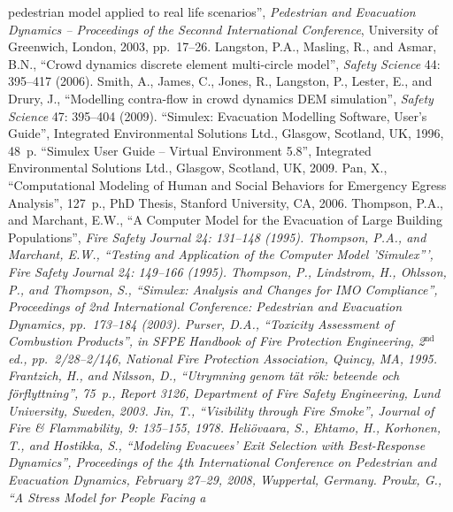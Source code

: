 \documentclass[12pt,a4paper,final,twoside]{stylevk}
\begin{document}
\begin{thebibliography}{99}
  pedestrian model applied to real life scenarios'', \emph{Pedestrian
    and Evacuation Dynamics -- Proceedings of the Seconnd International
    Conference}, University of Greenwich, London, 2003, pp.~17--26.
%
 Langston, P.A., Masling, R., and Asmar, B.N.,
  ``Crowd dynamics discrete element multi-circle model'', \emph{Safety
    Science} 44: 395--417 (2006).
%
 Smith, A., James, C., Jones, R., Langston, P.,
  Lester, E., and Drury, J., ``Modelling contra-flow in crowd dynamics
  DEM simulation'', \emph{Safety Science} 47: 395--404 (2009).
%
 ``Simulex: Evacuation Modelling Software, User's
  Guide'', Integrated Environmental Solutions Ltd., Glasgow, Scotland,
  UK, 1996, 48~p.
%
 ``Simulex User Guide -- Virtual Environment 5.8'',
  Integrated Environmental Solutions Ltd., Glasgow, Scotland, UK,
  2009.
%
 Pan, X., ``Computational Modeling of Human and Social
  Behaviors for Emergency Egress Analysis'', 127~p., PhD Thesis,
  Stanford University, CA, 2006.
%
 Thompson, P.A., and Marchant, E.W., ``A Computer
  Model for the Evacuation of Large Building Populations'', \em Fire
  Safety Journal \em 24: 131--148 (1995).
%
 Thompson, P.A., and Marchant, E.W., ``Testing
  and Application of the Computer Model 'Simulex''', \em Fire Safety
  Journal \em 24: 149--166 (1995).
%
 Thompson, P., Lindstrom, H., Ohlsson, P., and
  Thompson, S., ``Simulex: Analysis and Changes for IMO Compliance'',
  Proceedings of 2nd International Conference: Pedestrian and
  Evacuation Dynamics, pp.~173--184 (2003).
%
 Purser, D.A., ``Toxicity Assessment of Combustion
  Products'', in \emph{SFPE Handbook of Fire Protection Engineering},
  2${}^\textrm{nd}$ ed., pp.~2/28--2/146, National Fire Protection
  Association, Quincy, MA, 1995.
%
 Frantzich, H., and Nilsson, D., ``Utrymning
  genom tät r\"ok: beteende och f\"orflyttning'', 75~p., Report 3126,
  Department of Fire Safety Engineering, Lund University, Sweden,
  2003.
%
 Jin, T., ``Visibility through Fire Smoke'',
  \emph{Journal of Fire \& Flammability}, 9: 135--155, 1978.
%
 Heli\"ovaara, S., Ehtamo, H., Korhonen, T., and
  Hostikka, S., ``Modeling Evacuees' Exit Selection with Best-Response
  Dynamics'', Proceedings of the 4th International Conference on
  Pedestrian and Evacuation Dynamics, February 27--29, 2008,
  Wuppertal, Germany.
%
 Proulx, G., ``A Stress Model for People Facing a

\end{thebibliography}
\end{document}
